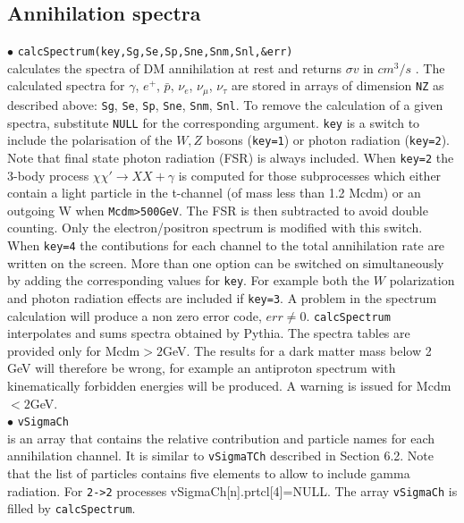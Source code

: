 \documentclass[12pt,a4paper]{article}
\begin{document}
\subsection{Annihilation spectra}
$\bullet$ \verb|calcSpectrum(key,Sg,Se,Sp,Sne,Snm,Snl,&err)|\\
calculates  the spectra  of DM annihilation 
at rest and returns $\sigma v$ in $cm^3/s$ . The calculated spectra
for $\gamma$, $e^+$, $\bar{p}$, $\nu_e$, $\nu_{\mu}$, $\nu_{\tau}$ 
are stored in arrays of dimension \verb|NZ| as described above: \verb|Sg|, \verb|Se|, \verb|Sp|, \verb|Sne|, \verb|Snm|, \verb|Snl|. 
 To remove the calculation of a given spectra, substitute  
\verb|NULL| for the corresponding argument. 
\verb|key| is a switch to include the polarisation of the  $W,Z$ bosons (\verb|key=1|) or
 photon radiation (\verb|key=2|).  
 Note that final state photon radiation (FSR) is always included.
When \verb|key=2| the 3-body  process $\chi\chi'\rightarrow XX +\gamma$ is computed for those subprocesses which either contain a light particle in the t-channel (of mass less than 1.2 Mcdm) or an outgoing W when \verb|Mcdm>500GeV|. The FSR is then subtracted to avoid double counting.
Only the electron/positron spectrum is modified with this switch.
When \verb|key=4| the contibutions  for each  channel to the total
annihilation rate  are written on the screen. More than one option
can be switched on simultaneously by adding the corresponding values for \verb|key|. 
For example both the $W$ polarization and photon radiation effects  are included if
\verb|key=3|.
A problem in the spectrum calculation will produce a non zero error code, $err\neq
0$. {\tt calcSpectrum} interpolates and sums spectra obtained
by Pythia. The spectra tables are provided only for Mcdm$>2$GeV. The results for a dark matter
mass below 2 GeV will therefore be wrong, for example an antiproton
spectrum  with  kinematically forbidden energies will be produced. A warning is issued for Mcdm$<2$GeV. \\ 
$\bullet$ \verb|vSigmaCh| \\
is an array that contains the relative contribution and particle names for each
annihilation channel. It is similar to  {\tt vSigmaTCh}
described in Section 6.2. Note that   the list of particles contains five elements to allow to include  gamma radiation. For \verb|2->2| processes vSigmaCh[n].prtcl[4]=NULL. The array {\tt vSigmaCh} is filled by 
{\tt calcSpectrum}. 
\end{document}
